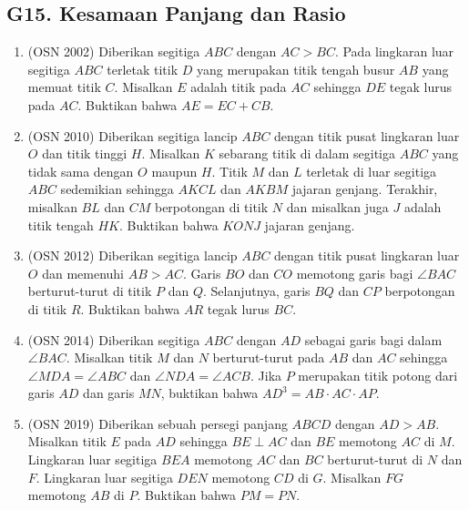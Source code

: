 \documentclass[12pt,a4paper]{article}
\begin{document}
\subsection{G15. Kesamaan Panjang dan Rasio}
\begin{enumerate}

\item (OSN 2002) Diberikan segitiga $ABC$ dengan $AC>BC$. Pada lingkaran luar segitiga $ABC$ terletak titik $D$ yang merupakan titik tengah busur $AB$ yang memuat titik $C$. Misalkan $E$ adalah titik pada $AC$ sehingga $DE$ tegak lurus pada $AC$.
Buktikan bahwa $AE=EC+CB$.

\item (OSN 2010) Diberikan segitiga lancip $ABC$ dengan titik pusat lingkaran luar $O$ dan titik tinggi $H$. Misalkan $K$ sebarang titik di dalam segitiga $ABC$ yang tidak sama dengan $O$ maupun $H$. Titik $M$ dan $L$ terletak di luar segitiga $ABC$ sedemikian sehingga $AKCL$ dan $AKBM$ jajaran genjang. Terakhir, misalkan $BL$ dan $CM$ berpotongan di titik $N$ dan misalkan juga $J$ adalah titik tengah $HK$. Buktikan bahwa $KONJ$ jajaran genjang.

\item (OSN 2012) Diberikan segitiga lancip $ABC$ dengan titik pusat lingkaran luar $O$ dan memenuhi $AB>AC$. Garis $BO$ dan $CO$ memotong garis bagi $\angle BAC$ berturut-turut di titik $P$ dan $Q$. Selanjutnya, garis $BQ$ dan $CP$ berpotongan di titik $R$. Buktikan bahwa $AR$ tegak lurus $BC$.

\item (OSN 2014) Diberikan segitiga $ABC$ dengan $AD$ sebagai garis bagi dalam $\angle BAC$. Misalkan titik $M$ dan $N$ berturut-turut pada $AB$ dan $AC$ sehingga $\angle MDA=\angle ABC$ dan $\angle NDA=\angle ACB$. Jika $P$ merupakan titik potong dari garis $AD$ dan garis $MN$, buktikan bahwa $AD^{3}=AB\cdot AC\cdot AP.$

\item (OSN 2019) Diberikan sebuah persegi panjang $ABCD$ dengan $AD > AB$. Misalkan titik $E$ pada $AD$ sehingga $BE \perp AC$ dan $BE$ memotong $AC$ di $M$. Lingkaran luar segitiga $BEA$ memotong $AC$ dan $BC$ berturut-turut di $N$ dan $F$. Lingkaran luar segitiga $DEN$ memotong $CD$ di $G$. Misalkan $FG$ memotong $AB$ di $P$. Buktikan bahwa $PM = PN$.


\end{enumerate}
\end{document}
